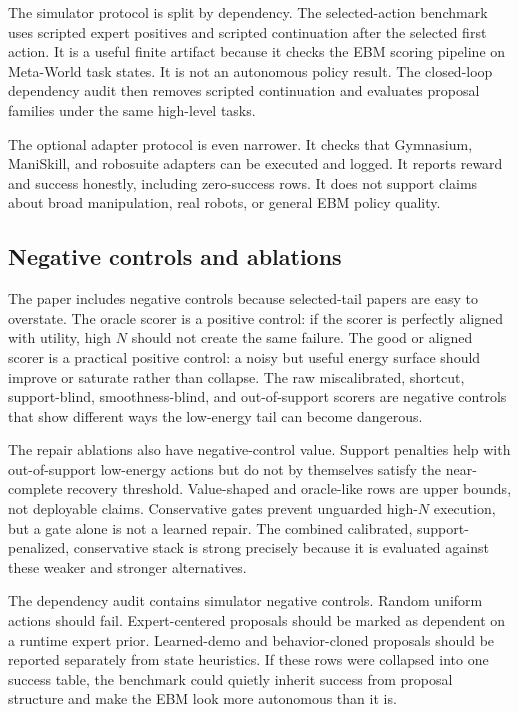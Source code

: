 The simulator protocol is split by dependency. The selected-action benchmark
uses scripted expert positives and scripted continuation after the selected
first action. It is a useful finite artifact because it checks the EBM scoring
pipeline on Meta-World task states. It is not an autonomous policy result. The
closed-loop dependency audit then removes scripted continuation and evaluates
proposal families under the same high-level tasks.

The optional adapter protocol is even narrower. It checks that Gymnasium,
ManiSkill, and robosuite adapters can be executed and logged. It reports
reward and success honestly, including zero-success rows. It does not support
claims about broad manipulation, real robots, or general EBM policy quality.

\subsection{Negative controls and ablations}
\label{app:V4-negative-controls}

The paper includes negative controls because selected-tail papers are easy to
overstate. The oracle scorer is a positive control: if the scorer is perfectly
aligned with utility, high \(N\) should not create the same failure. The good
or aligned scorer is a practical positive control: a noisy but useful energy
surface should improve or saturate rather than collapse. The raw
miscalibrated, shortcut, support-blind, smoothness-blind, and out-of-support
scorers are negative controls that show different ways the low-energy tail can
become dangerous.

The repair ablations also have negative-control value. Support penalties help
with out-of-support low-energy actions but do not by themselves satisfy the
near-complete recovery threshold. Value-shaped and oracle-like rows are upper
bounds, not deployable claims. Conservative gates prevent unguarded high-\(N\)
execution, but a gate alone is not a learned repair. The combined calibrated,
support-penalized, conservative stack is strong precisely because it is
evaluated against these weaker and stronger alternatives.

The dependency audit contains simulator negative controls. Random uniform
actions should fail. Expert-centered proposals should be marked as dependent
on a runtime expert prior. Learned-demo and behavior-cloned proposals should
be reported separately from state heuristics. If these rows were collapsed
into one success table, the benchmark could quietly inherit success from
proposal structure and make the EBM look more autonomous than it is.


